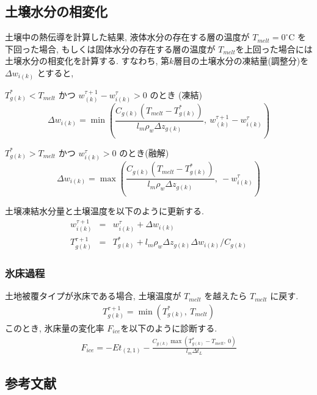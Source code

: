 \subsection{土壌水分の相変化}

土壌中の熱伝導を計算した結果, 液体水分の存在する層の温度が $T_{melt} =
0^{\circ}$C を下回った場合, もしくは固体水分の存在する層の温度が
$T_{melt}$を上回った場合には土壌水分の相変化を計算する. 
すなわち, 第$k$層目の土壌水分の凍結量(調整分)を $\Delta w_{i(k)}$ とすると, 

$T_{g(k)}^*<T_{melt}$ かつ $w_{(k)}^{\tau+1}-w_{i(k)}^{\tau}>0$ のとき
(凍結)
\begin{equation}
\Delta w_{i(k)} = \min\left(
\frac{C_{g(k)}(T_{melt}-T_{g(k)}^*)}{l_m \rho_w \Delta z_{g(k)}}, \ 
w_{(k)}^{\tau+1}-w_{i(k)}^{\tau}
\right)
\end{equation}

$T_{g(k)}^*>T_{melt}$ かつ $w_{i(k)}^{\tau}>0$ のとき(融解)
\begin{equation}
\Delta w_{i(k)} = \max\left(
\frac{C_{g(k)}(T_{melt}-T_{g(k)}^*)}{l_m \rho_w \Delta z_{g(k)}}, \ 
-w_{i(k)}^{\tau}
\right)
\end{equation}

土壌凍結水分量と土壌温度を以下のように更新する. 
\begin{eqnarray}
w_{i(k)}^{\tau+1} &=& w_{i(k)}^{\tau} + \Delta w_{i(k)} \\
T_{g(k)}^{\tau+1} &=& T_{g(k)}^* + l_m \rho_w \Delta z_{g(k)} \Delta w_{i(k)} / C_{g(k)}
\end{eqnarray}

\subsubsection{氷床過程}

土地被覆タイプが氷床である場合, 土壌温度が $T_{melt}$ を越えたら
$T_{melt}$ に戻す. 
\begin{eqnarray}
 T_{g(k)}^{\tau+1} = \min( T_{g(k)}^*, \ T_{melt} )
\end{eqnarray}
このとき, 氷床量の変化率 $F_{ice}$を以下のように診断する. 
\begin{eqnarray}
 F_{ice} = - Et_{(2,1)} - \frac{C_{g(k)}\max(T_{g(k)}^* - T_{melt},\ 0)}{l_m \Delta t_L}
\end{eqnarray}

\subsection*{参考文献}

